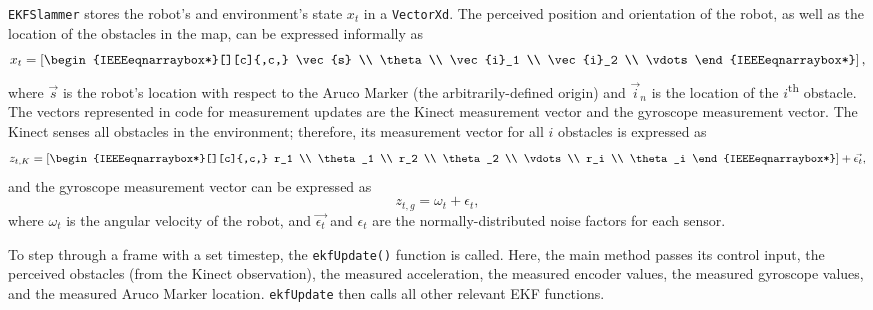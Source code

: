 \documentclass[journal]{IEEEtran}
\begin{document}
\texttt{EKFSlammer} stores the robot's and environment's state $x_t$ in a \texttt{VectorXd}. The
perceived position and orientation of the robot, as well as the location of the obstacles in the map, 
can be expressed informally as 
\begin{equation*}
 x_t = \left[\begin{IEEEeqnarraybox*}[][c]{,c,}
        \vec{s} \\
        \theta \\
        \vec{i}_1 \\
        \vec{i}_2 \\
        \vdots
        \end{IEEEeqnarraybox*}\right],
\end{equation*}
where $\vec{s}$ is the robot's location with respect to the Aruco Marker (the arbitrarily-defined
origin) and $\vec{i}_n$ is the location of the $i$\textsuperscript{th} obstacle. The vectors represented
in code for measurement updates are the Kinect measurement vector and the gyroscope measurement vector.
The Kinect senses all obstacles in the environment; therefore, its measurement vector for all $i$ obstacles 
is expressed as
\begin{equation*}
 z_{t,K} = \left[\begin{IEEEeqnarraybox*}[][c]{,c,}
           r_1 \\
           \theta_1 \\
           r_2 \\
           \theta_2 \\
           \vdots \\
           r_i \\
           \theta_i
           \end{IEEEeqnarraybox*}\right] + \vec{\epsilon_t},
\end{equation*}
and the gyroscope measurement vector can be expressed as 
\begin{equation*}
 z_{t,g} = \omega_t + \epsilon_t,
\end{equation*}
where $\omega_t$ is the angular velocity of the robot, and $\vec{\epsilon_t}$ and $\epsilon_t$ are the 
normally-distributed noise factors for each sensor.

To step through a frame with a set timestep, the \texttt{ekfUpdate()} function is called. Here, the main 
method passes its control input, the perceived obstacles (from the Kinect observation), the measured 
acceleration, the measured encoder values, the measured gyroscope values, and the measured Aruco 
Marker location. \texttt{ekfUpdate} then calls all other relevant EKF functions. 
\end{document}
